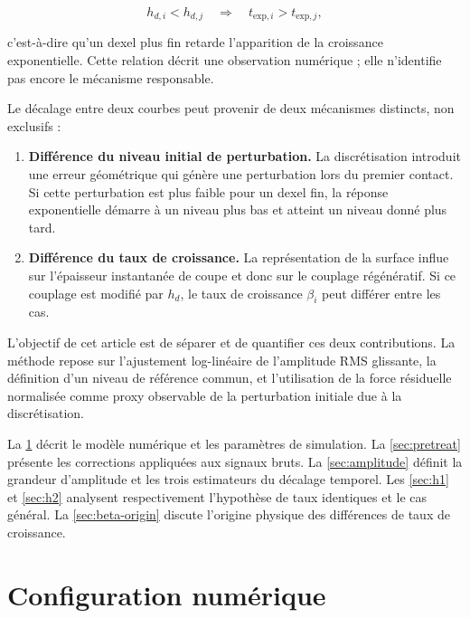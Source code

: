\documentclass[11pt,a4paper]{article}
\newcommand{\dxl}{h_{d}}                       %
\newcommand{\dxli}{h_{d,i}}                    %
\newcommand{\betai}{\beta_i}                   %
\begin{document}
\begin{equation}
    \dxli < h_{d,j}
    \quad\Longrightarrow\quad
    t_{\mathrm{exp},i} > t_{\mathrm{exp},j},
    \label{eq:observation}
\end{equation}

c'est-à-dire qu'un dexel plus fin retarde l'apparition de la croissance
exponentielle. Cette relation décrit une observation numérique ; elle n'identifie
pas encore le mécanisme responsable.

Le décalage entre deux courbes peut provenir de deux mécanismes distincts,
non exclusifs :

\begin{enumerate}
    \item \textbf{Différence du niveau initial de perturbation.} La
    discrétisation introduit une erreur géométrique qui génère une perturbation
    lors du premier contact. Si cette perturbation est plus faible pour un dexel
    fin, la réponse exponentielle démarre à un niveau plus bas et atteint un
    niveau donné plus tard.
    \item \textbf{Différence du taux de croissance.} La représentation de la
    surface influe sur l'épaisseur instantanée de coupe et donc sur le couplage
    régénératif. Si ce couplage est modifié par \(\dxl\), le taux de croissance
    \(\betai\) peut différer entre les cas.
\end{enumerate}

L'objectif de cet article est de séparer et de quantifier ces deux contributions.
La méthode repose sur l'ajustement log-linéaire de l'amplitude RMS glissante,
la définition d'un niveau de référence commun, et l'utilisation de la force
résiduelle normalisée comme proxy observable de la perturbation initiale due à
la discrétisation.

La \ref{sec:setup} décrit le modèle numérique et les paramètres de simulation.
La \ref{sec:pretreat} présente les corrections appliquées aux signaux bruts.
La \ref{sec:amplitude} définit la grandeur d'amplitude et les trois
estimateurs du décalage temporel. Les \ref{sec:h1} et \ref{sec:h2} analysent
respectivement l'hypothèse de taux identiques et le cas général.
La \ref{sec:beta-origin} discute l'origine physique des différences de taux de
croissance.


\section{Configuration numérique}
\label{sec:setup}
\end{document}
